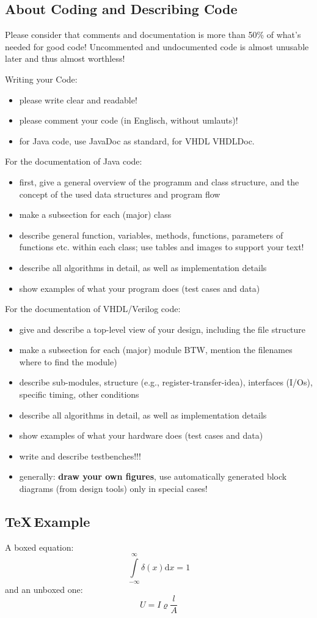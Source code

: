 \subsection{About Coding and Describing Code}

Please consider that comments and documentation is more than 50\%
of what's needed for good code! Uncommented and undocumented code
is almost unusable later and thus almost worthless!

 Writing your Code:

\begin{itemize}
\item please write clear and readable!
\item please comment your code (in Englisch, without umlauts)!
\item for Java code, use JavaDoc as standard, for VHDL VHDLDoc. 
\end{itemize}

For the documentation of Java code:

\begin{itemize}
\item first, give a general overview of the programm and class structure, and the concept of the used data structures and program flow
\item make a subsection for each (major) class
\item describe general function, variables, methods, functions, parameters of functions etc. within each class; use tables and images to support your text!
\item describe all algorithms in detail, as well as implementation details
\item show examples of what your program does (test cases and data) 
\end{itemize}

For the documentation of VHDL/Verilog code:
\begin{itemize}
\item give and describe a top-level view of your design, including the file structure
\item make a subsection for each (major) module
  BTW, mention the filenames where to find the module)
\item describe sub-modules, structure (e.g., register-transfer-idea), interfaces (I/Os), specific timing, other conditions
\item describe all algorithms in detail, as well as implementation details
\item show examples of what your hardware does (test cases and data)
\item write and describe testbenches!!!
\item generally: {\bf draw your own figures}, use automatically generated block diagrams (from design tools) only in special cases!
\end{itemize}


\subsection{\TeX \,Example}
\noindent
A boxed equation:
\begin{equation}
\boxed{\int\limits_{-\infty}^{\infty}\delta(x)\mathrm{d}x=1}
\end{equation}
and an unboxed one:
\begin{equation}
U=I\varrho\frac{l}{A}
\end{equation}

